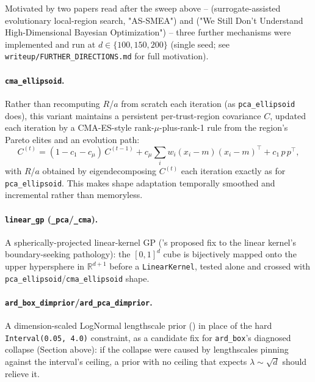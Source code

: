 \documentclass[11pt]{article}
\begin{document}
Motivated by two papers read after the sweep above --
\citet{wang2026assmea} (surrogate-assisted evolutionary local-region search,
"AS-SMEA") and \citet{doumont2026linearbo} ("We Still Don't Understand
High-Dimensional Bayesian Optimization") -- three further mechanisms were
implemented and run at $d\in\{100,150,200\}$ (single seed; see
\texttt{writeup/FURTHER\_DIRECTIONS.md} for full motivation).

\paragraph{\texttt{cma\_ellipsoid}.} Rather than recomputing $R$/$a$ from
scratch each iteration (as \texttt{pca\_ellipsoid} does), this variant
maintains a persistent per-trust-region covariance $C$, updated each
iteration by a CMA-ES-style rank-$\mu$-plus-rank-1 rule from the region's
Pareto elites and an evolution path:
\begin{equation}
  C^{(t)} = (1-c_1-c_\mu)\,C^{(t-1)} + c_\mu \sum_i w_i (x_i-m)(x_i-m)^\top + c_1\,p\,p^\top,
\end{equation}
with $R$/$a$ obtained by eigendecomposing $C^{(t)}$ each iteration exactly
as for \texttt{pca\_ellipsoid}. This makes shape adaptation temporally
smoothed and incremental rather than memoryless.

\paragraph{\texttt{linear\_gp} (\texttt{\_pca}/\texttt{\_cma}).} A
spherically-projected linear-kernel GP (\citealp{doumont2026linearbo}'s
proposed fix to the linear kernel's boundary-seeking pathology): the
$[0,1]^d$ cube is bijectively mapped onto the upper hypersphere in
$\mathbb{R}^{d+1}$ before a \texttt{LinearKernel}, tested alone and crossed
with \texttt{pca\_ellipsoid}/\texttt{cma\_ellipsoid} shape.

\paragraph{\texttt{ard\_box\_dimprior}/\texttt{ard\_pca\_dimprior}.} A
dimension-scaled LogNormal lengthscale prior (\citealp{hvarfner2024vanilla})
in place of the hard \texttt{Interval(0.05, 4.0)} constraint, as a candidate
fix for \texttt{ard\_box}'s diagnosed collapse (Section above): if the
collapse were caused by lengthscales pinning against the interval's
ceiling, a prior with no ceiling that expects $\lambda \sim \sqrt{d}$ should
relieve it.
\end{document}

